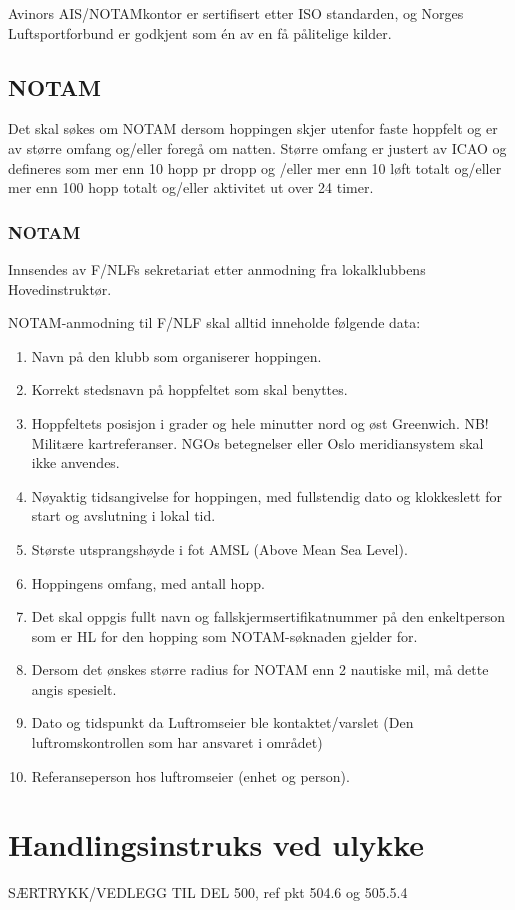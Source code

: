 Avinors AIS/NOTAMkontor er sertifisert etter ISO standarden, og Norges Luftsportforbund er godkjent som én av en få pålitelige kilder.

\subsection{NOTAM}
Det skal søkes om NOTAM dersom hoppingen skjer utenfor faste hoppfelt og er av større omfang og/eller foregå om natten. Større omfang er justert av ICAO og defineres som mer enn 10 hopp pr dropp og /eller mer enn 10 løft totalt og/eller mer enn 100 hopp totalt og/eller aktivitet ut over 24 timer.

\subsubsection{NOTAM}
Innsendes av F/NLFs sekretariat etter anmodning fra lokalklubbens Hovedinstruktør.

NOTAM-anmodning til F/NLF skal alltid inneholde følgende data:
\begin{enumerate}
	\item Navn på den klubb som organiserer hoppingen.
	\item Korrekt stedsnavn på hoppfeltet som skal benyttes.
	\item Hoppfeltets posisjon i grader og hele minutter nord og øst Greenwich. NB! Militære kartreferanser. NGOs betegnelser eller Oslo meridiansystem skal ikke anvendes.
	\item Nøyaktig tidsangivelse for hoppingen, med fullstendig dato og klokkeslett for start og avslutning i lokal tid.
	\item Største utsprangshøyde i fot AMSL (Above Mean Sea Level).
	\item Hoppingens omfang, med antall hopp.
	\item Det skal oppgis fullt navn og fallskjermsertifikatnummer på den enkeltperson som er HL for den hopping som NOTAM-søknaden gjelder for.
	\item Dersom det ønskes større radius for NOTAM enn 2 nautiske mil, må dette angis spesielt.
	\item Dato og tidspunkt da Luftromseier ble kontaktet/varslet (Den luftromskontrollen som har ansvaret i området)
	\item Referanseperson hos luftromseier (enhet og person).
\end{enumerate}

\section{Handlingsinstruks ved ulykke}
SÆRTRYKK/VEDLEGG TIL DEL 500, ref pkt 504.6 og 505.5.4

